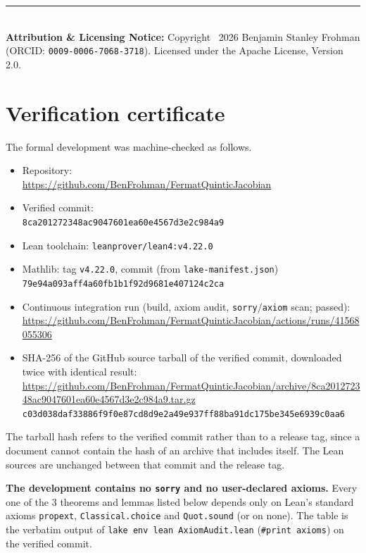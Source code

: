 \documentclass[11pt,a4paper]{article}
\begin{document}
\vfill
\noindent\rule{\textwidth}{0.4pt}\\
\footnotesize
\textbf{Attribution \& Licensing Notice:} Copyright \textcopyright\ 2026 Benjamin Stanley Frohman (ORCID: \texttt{0009-0006-7068-3718}).
Licensed under the Apache License, Version 2.0.
\appendix
\section{Verification certificate}\label{app:verification-certificate}

The formal development was machine-checked as follows.

{\raggedright
\begin{itemize}
\item Repository:\\ {\footnotesize\url{https://github.com/BenFrohman/FermatQuinticJacobian}}
\item Verified commit:\\ {\footnotesize\texttt{8ca201272348ac9047601ea60e4567d3e2c984a9}}
\item Lean toolchain: \texttt{leanprover/lean4:v4.22.0}
\item Mathlib: tag \texttt{v4.22.0}, commit (from \texttt{lake-manifest.json})\\ {\footnotesize\texttt{79e94a093aff4a60fb1b1f92d9681e407124c2ca}}
\item Continuous integration run (build, axiom audit, \texttt{sorry}/\texttt{axiom} scan; passed):\\ {\footnotesize\url{https://github.com/BenFrohman/FermatQuinticJacobian/actions/runs/41568055306}}
\item SHA-256 of the GitHub source tarball of the verified commit, downloaded twice with identical result:\\ {\footnotesize\url{https://github.com/BenFrohman/FermatQuinticJacobian/archive/8ca201272348ac9047601ea60e4567d3e2c984a9.tar.gz}}\\
{\footnotesize\texttt{c03d038daf33886f9f0e87cd8d9e2a49e937ff88ba91dc175be345e6939c0aa6}}
\end{itemize}\par}

The tarball hash refers to the verified commit rather than to a release tag, since a document cannot contain the hash of an archive that includes itself. The Lean sources are unchanged between that commit and the release tag.

\textbf{The development contains no \texttt{sorry} and no user-declared axioms.} Every one of the 3 theorems and lemmas listed below depends only on Lean's standard axioms \texttt{propext}, \texttt{Classical.choice} and \texttt{Quot.sound} (or on none). The table is the verbatim output of \texttt{lake env lean AxiomAudit.lean} (\texttt{\#print axioms}) on the verified commit.
\end{document}
